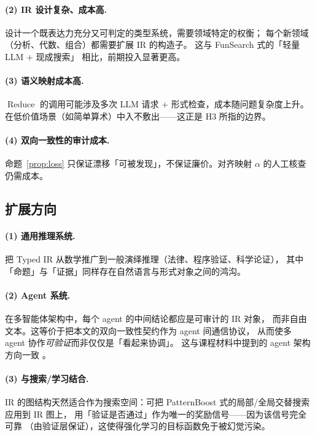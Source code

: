 \documentclass[UTF8,a4paper,11pt]{ctexart}
\DeclareMathOperator{\Reduce}{Reduce}
\begin{document}
\paragraph{(2) IR 设计复杂、成本高.}
设计一个既表达力充分又可判定的类型系统，需要领域特定的权衡；
每个新领域（分析、代数、组合）都需要扩展 IR 的构造子。
这与 FunSearch \citep{romera2024funsearch} 式的「轻量 LLM $+$ 现成搜索」
相比，前期投入显著更高。

\paragraph{(3) 语义映射成本高.}
$\Reduce$ 的调用可能涉及多次 LLM 请求 $+$ 形式检查，成本随问题复杂度上升。
在低价值场景（如简单算术）中入不敷出——这正是 H3 所指的边界。

\paragraph{(4) 双向一致性的审计成本.}
命题~\ref{prop:loss} 只保证漂移「可被发现」，不保证廉价。对齐映射 $\alpha$
的人工核查仍需成本。

\subsection{扩展方向}

\paragraph{(1) 通用推理系统.}
把 Typed IR 从数学推广到一般演绎推理（法律、程序验证、科学论证），
其中「命题」与「证据」同样存在自然语言与形式对象之间的鸿沟。

\paragraph{(2) Agent 系统.}
在多智能体架构中，每个 agent 的中间结论都应是可审计的 IR 对象，
而非自由文本。这等价于把本文的双向一致性契约作为 agent 间通信协议，
从而使多 agent 协作\emph{可验证}而非仅仅是「看起来协调」。
这与课程材料中提到的 agent 架构方向一致 \citep{chen2026lectures}。

\paragraph{(3) 与搜索/学习结合.}
IR 的图结构天然适合作为搜索空间：可把 PatternBoost
\citep{charton2024patternboost} 式的局部/全局交替搜索应用到 IR 图上，
用「验证是否通过」作为唯一的奖励信号——因为该信号完全可靠
（由验证层保证），这使得强化学习的目标函数免于被幻觉污染。
\end{document}
